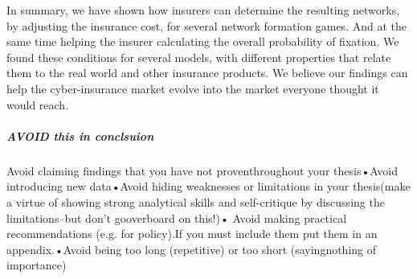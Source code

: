 In summary, we have shown how insurers can determine the resulting networks, by adjusting the insurance cost, for several network formation games. And at the same time helping the insurer calculating the overall probability of fixation.
We found these conditions for several models, with different properties that relate them to the real world and other insurance products. We believe our findings can help the cyber-insurance market evolve into the market everyone thought it would reach.


\subparagraph{AVOID this in conclsuion}
Avoid claiming findings that you have not proventhroughout your thesis•Avoid introducing new data•Avoid hiding weaknesses or limitations in your thesis(make a virtue of showing strong analytical skills and self-critique by discussing the limitations--but don’t gooverboard on this!)• Avoid making practical recommendations (e.g. for policy).If you must include them put them in an appendix.•Avoid being too long (repetitive) or too short (sayingnothing of importance)
